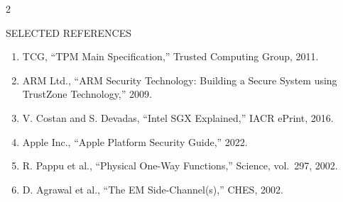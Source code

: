 \documentclass[10pt]{article}
\begin{document}
\begin{multicols}{2}
\begin{sectionbox}{SELECTED REFERENCES}
\begingroup
\fontsize{7.2}{8.2}\selectfont
\setlength{\parskip}{0pt}
\begin{enumerate}[leftmargin=*, itemsep=0pt, topsep=0pt, parsep=0pt, partopsep=0pt]
\item TCG, ``TPM Main Specification,'' Trusted Computing Group, 2011.
\item ARM Ltd., ``ARM Security Technology: Building a Secure System using TrustZone Technology,'' 2009.
\item V. Costan and S. Devadas, ``Intel SGX Explained,'' IACR ePrint, 2016.
\item Apple Inc., ``Apple Platform Security Guide,'' 2022.
\item R. Pappu et al., ``Physical One-Way Functions,'' Science, vol.~297, 2002.
\item D. Agrawal et al., ``The EM Side-Channel(s),'' CHES, 2002.
\end{enumerate}
\endgroup
\end{sectionbox}

\end{multicols}
\end{document}
